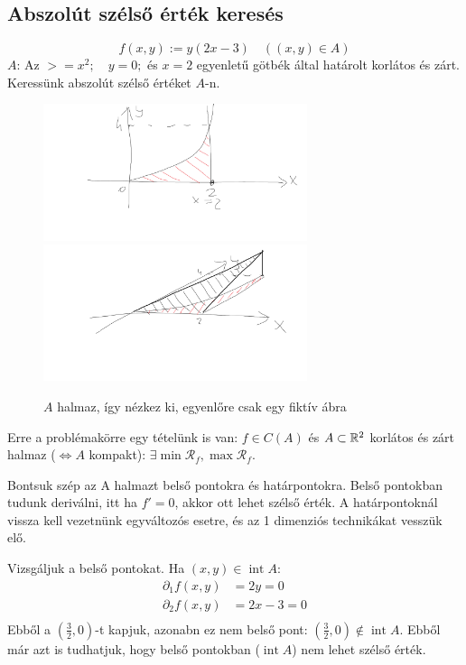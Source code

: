\documentclass[a4paper,11.5pt]{article}
\DeclareMathOperator{\Int}{int}
\begin{document}
	\subsection{Abszolút szélső érték keresés}
	\begin{task}
		\[ f(x,y):=y(2x-3)\quad ((x,y)\in A) \]
		$A$: Az $>=x^2;\quad y=0;$ és $x=2$ egyenletű götbék által határolt korlátos és zárt. Keressünk abszolút szélső értéket $A$-n.
		\begin{figure}[H]
			\centering
			\includegraphics[height=4cm]{../2zh/kepek/46.png}\quad \quad \quad 
			\includegraphics[height=4cm]{../2zh/kepek/47.png}
			\caption{$A$ halmaz, így nézkez ki, egyenlőre csak egy fiktív ábra}
		\end{figure}
		Erre a problémakörre egy tételünk is van: $f\in C(A)$ és $A\subset\mathbb{R}^2$ korlátos és zárt halmaz ($\Leftrightarrow A$ kompakt): $\exists\min\mathcal{R}_f, \max\mathcal{R}_f$.
		
		Bontsuk szép az A halmazt belső pontokra és határpontokra. Belső pontokban tudunk deriválni, itt ha $f'=0$, akkor ott lehet szélső érték. A határpontoknál vissza kell vezetnünk egyváltozós esetre, és az 1 dimenziós technikákat vesszük elő.
		
		\medskip
		Vizsgáljuk a belső pontokat. Ha $(x,y)\in\Int A$:
		\begin{align*}
			\partial_1f(x,y)&=2y=0\\
			\partial_2f(x,y)&=2x-3=0\\
		\end{align*}
		Ebből a $\left(\frac{3}{2},0\right)$-t kapjuk, azonabn ez nem belső pont: $\left(\frac{3}{2},0\right)\notin\Int A$. Ebből már azt is tudhatjuk, hogy belső pontokban ($\Int A$) nem lehet szélső érték.
		\medskip
		

\end{task}
\end{document}
